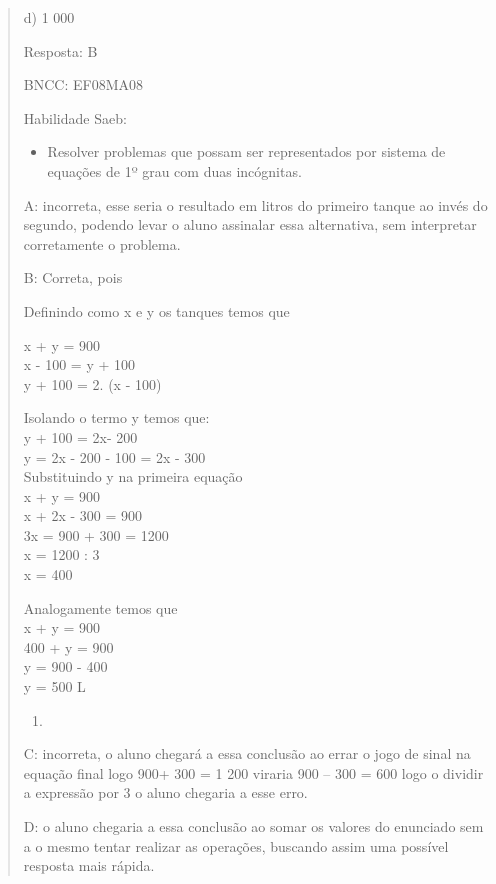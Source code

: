 \begin{quote}
\begin{escolha}
d) 1 000

Resposta: B

BNCC: EF08MA08

Habilidade Saeb:

\begin{itemize}
\tightlist
\item
  Resolver problemas que possam ser representados por sistema de
  equações de 1º grau com duas incógnitas.
\end{itemize}

A: incorreta, esse seria o resultado em litros do primeiro tanque ao
invés do segundo, podendo levar o aluno assinalar essa alternativa, sem
interpretar corretamente o problema.

B: Correta, pois

Definindo como x e y os tanques temos que

x + y = 900\\
x - 100 = y + 100\\
y + 100 = 2. (x - 100)

Isolando o termo y temos que:\\
y + 100 = 2x- 200\\
y = 2x - 200 - 100 = 2x - 300\\
Substituindo y na primeira equação\\
x + y = 900\\
x + 2x - 300 = 900\\
3x = 900 + 300 = 1200\\
x = 1200 : 3\\
x = 400

Analogamente temos que\\
x + y = 900\\
400 + y = 900\\
y = 900 - 400\\
y = 500 L

\begin{enumerate}
\def\labelenumi{\Alph{enumi}.}
\setcounter{enumi}{1}
\tightlist
\item
\end{enumerate}

C: incorreta, o aluno chegará a essa conclusão ao errar o jogo de sinal
na equação final logo 900+ 300 = 1 200 viraria 900 -- 300 = 600 logo o
dividir a expressão por 3 o aluno chegaria a esse erro.

D: o aluno chegaria a essa conclusão ao somar os valores do enunciado
sem a o mesmo tentar realizar as operações, buscando assim uma possível
resposta mais rápida.


\end{escolha}
\end{quote}
